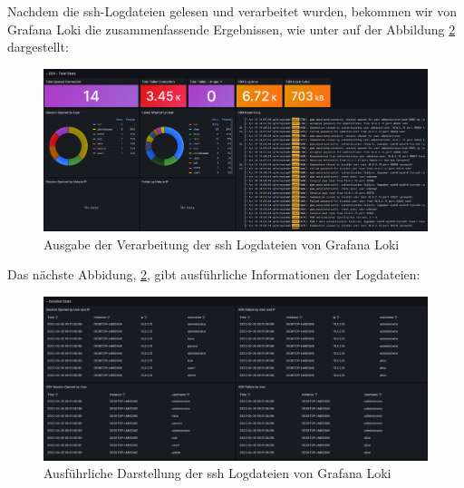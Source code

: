 \newpage
{}
\thispagestyle{lscape}
\begin{landscape}
   Nachdem die \gls{ssh}-Logdateien gelesen und verarbeitet wurden, bekommen wir von Grafana Loki die zusammenfassende Ergebnissen, wie unter auf der Abbildung \ref{fig:Grafana_DetailedStats} dargestellt:
    \begin{figure}[H]
        \centerline{\includegraphics[width=1.7\textwidth]{assets/GrafanaLoki_ssh}}
        \caption[Ausgabe der Verarbeitung der \gls{ssh} Logdateien von Grafana Loki]
        {Ausgabe der Verarbeitung der \gls{ssh} Logdateien von Grafana Loki}
        \label{fig:Grafana_Grafik}
        \centering
    \end{figure}
\end{landscape}
\restoregeometry

\newpage
{}
\thispagestyle{lscape}
\begin{landscape}
   Das nächste Abbidung, \ref{fig:Grafana_DetailedStats}, gibt ausführliche Informationen der Logdateien:
    \begin{figure}[H]
        \centerline{\includegraphics[width=1.7\textwidth]{assets/GrafanaLoki_sshDetailed.png}}
        \caption[Ausführliche Darstellung der \gls{ssh} Logdateien von Grafana Loki]
        {Ausführliche Darstellung der \gls{ssh} Logdateien von Grafana Loki}
        \label{fig:Grafana_DetailedStats}
        \centering
    \end{figure}
\end{landscape}
\restoregeometry

